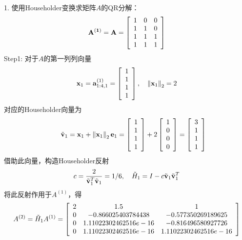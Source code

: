\documentclass[UTF8]{ctexart}
\begin{document}
1. 使用Householder变换求矩阵$A$的QR分解：\\
\begin{align}
\mathbf{A^{(1)}}=\mathbf{A}=\left[\begin{array}{ccc}
1 & 0 & 0 \\
1 & 1 & 0 \\
1 & 1 & 1 \\
1 & 1 & 1
\end{array}\right]\notag
\end{align}
Step1: 对于$A$的第一列列向量
\begin{align}
	\mathbf{x}_{1}=\mathbf{a}_{1: 4,1}^{(1)}=\left[\begin{array}{c}
	1 \\
	1 \\
	1 \\
	1
	\end{array}\right], \quad\left\|\mathbf{x}_{1}\right\|_{2}=2 \notag
\end{align}
对应的Householder向量为
\begin{align}
	\begin{array}{l}
	\qquad \tilde{\mathbf{v}}_{1}=\mathbf{x}_{1}+\left\|\mathbf{x}_{1}\right\|_{2} \mathbf{e}_{1}=\left[\begin{array}{c}
	1 \\
	1 \\
	1 \\
	1 
	\end{array}\right]+2\left[\begin{array}{r}
	1 \\
	0 \\
	0 \\
	0 
	\end{array}\right]=\left[\begin{array}{c}
	3 \\
	1 \\
	1 \\
	1 
	\end{array}\right]
	\end{array} \notag
\end{align}
借助此向量，构造Householder反射
\begin{align}
	c=\frac{2}{\tilde{\mathbf{v}}_{1}^{T} \tilde{\mathbf{v}}_{1}}=1/6, \quad \tilde{H}_{1}=I-c \tilde{\mathbf{v}}_{1} \tilde{\mathbf{v}}_{1}^{T} \notag
\end{align}
将此反射作用于$A^{(1)}$，得
\begin{align}
	A^{(2)} = \tilde{H}_{1} A^{(1)} = 
	\left[\begin{array}{ccc}
	2 &	1.5 &	1 \\
	0 &	-0.866025403784438 &	-0.577350269189625 \\
	0 &	1.11022302462516e-16 &	-0.816496580927726 \\
	0 &	1.11022302462516e-16 &	1.11022302462516e-16
	\end{array}\right]  \notag
\end{align}
\end{document}
